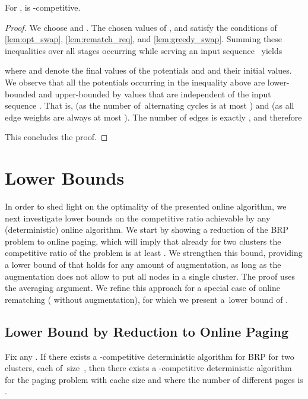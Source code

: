 \documentclass{siamart190516}
\begin{document}
\begin{theorem}
\label{thm:rematching}
For ,  is -competitive.
\end{theorem}

\begin{proof}
We choose  and . The chosen values of ,  and 
satisfy the conditions of \cref{lem:opt_swap}, \cref{lem:rematch_req},
and \cref{lem:greedy_swap}. Summing these
inequalities over all stages occurring while serving an input sequence~
yields

where  and  denote the final
values of the potentials and  and
 their initial values. We observe that all the
potentials occurring in the inequality above are lower-bounded and
upper-bounded by values that are independent of the input sequence .
That is,  (as the number of~alternating cycles is at most ) and
 (as all edge weights are always 
at most ). The number of edges is exactly , and therefore

This concludes the proof.
\end{proof}




\section{Lower Bounds}
\label{sec:lower}

In order to shed light on the optimality of the presented online algorithm, we
next investigate lower bounds on the competitive ratio achievable by any
(deterministic) online algorithm. We start by showing a reduction of the BRP
problem to online paging, which will imply that already for two clusters the
competitive ratio of the problem is at least . We strengthen this bound,
providing a lower bound of  that holds for any amount of augmentation, as
long as the augmentation does not allow to put all nodes in a single 
cluster. The proof uses the averaging argument. We refine this approach for a
special case of online rematching ( without augmentation), for which we
present a~lower bound of .


\subsection{Lower Bound by Reduction to Online Paging}
\label{sec:paging}

\begin{theorem}
Fix any . If there exists a -competitive deterministic algorithm 
for BRP for two clusters, each of~size~, then there exists a
-competitive deterministic algorithm  for the paging problem with 
cache size  and where the number of different pages is .
\end{theorem}
\end{document}
